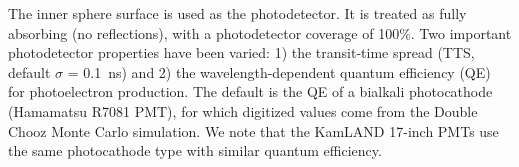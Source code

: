 \documentclass[cits]{JINST}
\begin{document}
The inner sphere surface is used as the photodetector. It is treated
as fully absorbing (no reflections), with a photodetector coverage of
100\%. Two important photodetector properties have been varied: 1)
the transit-time spread (TTS, default $\sigma$ = 0.1~ns) and 2) the
wavelength-dependent quantum efficiency (QE) for photoelectron
production. The default is the QE of a bialkali photocathode (Hamamatsu
R7081 PMT)\cite{Hamamatsu_R7081}, for which digitized values come from the Double Chooz\cite{dctwo}
Monte Carlo simulation. We note that the KamLAND 17-inch PMTs use the
same photocathode type with similar quantum efficiency.

\begin{figure}[tbh]
\begin{center}

\end{center}
\end{figure}
\end{document}
